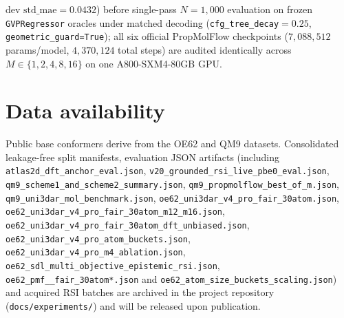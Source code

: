 \documentclass[11pt,a4paper]{article}
\begin{document}
dev $\text{std\_mae}=0.0432$) before single-pass $N=1{,}000$ evaluation on frozen \texttt{GVPRegressor} oracles under matched decoding (\texttt{cfg\_tree\_decay}$=0.25$, \texttt{geometric\_guard=True}); all six official PropMolFlow checkpoints ($7{,}088{,}512$ params/model, $4{,}370{,}124$ total steps) are audited identically across $M\in\{1,2,4,8,16\}$ on one A800-SXM4-80GB GPU.

\section*{Data availability}
{\sloppy
Public base conformers derive from the OE62\cite{stuke2020oe62} and QM9\cite{ramakrishnan2014qm9} datasets. Consolidated leakage-free split manifests, evaluation JSON artifacts (including \texttt{atlas2d\_\allowbreak dft\_\allowbreak anchor\_\allowbreak eval.json}, \texttt{v20\_\allowbreak grounded\_\allowbreak rsi\_\allowbreak live\_\allowbreak pbe0\_\allowbreak eval.json}, \texttt{qm9\_\allowbreak scheme1\_\allowbreak and\_\allowbreak scheme2\_\allowbreak summary.json}, \texttt{qm9\_\allowbreak propmolflow\_\allowbreak best\_\allowbreak of\_\allowbreak m.json}, \texttt{qm9\_\allowbreak uni3dar\_\allowbreak mol\_\allowbreak benchmark.json}, \texttt{oe62\_\allowbreak uni3dar\_\allowbreak v4\_\allowbreak pro\_\allowbreak fair\_\allowbreak 30atom.json}, \texttt{oe62\_\allowbreak uni3dar\_\allowbreak v4\_\allowbreak pro\_\allowbreak fair\_\allowbreak 30atom\_\allowbreak m12\_\allowbreak m16.json}, \texttt{oe62\_\allowbreak uni3dar\_\allowbreak v4\_\allowbreak pro\_\allowbreak fair\_\allowbreak 30atom\_\allowbreak dft\_\allowbreak unbiased.json}, \texttt{oe62\_\allowbreak uni3dar\_\allowbreak v4\_\allowbreak pro\_\allowbreak atom\_\allowbreak buckets.json}, \texttt{oe62\_\allowbreak uni3dar\_\allowbreak v4\_\allowbreak pro\_\allowbreak m4\_\allowbreak ablation.json}, \texttt{oe62\_\allowbreak sdl\_\allowbreak multi\_\allowbreak objective\_\allowbreak epistemic\_\allowbreak rsi.json}, \texttt{oe62\_\allowbreak pmf\_\allowbreak *\_\allowbreak fair\_\allowbreak 30atom*.json} and \texttt{oe62\_\allowbreak atom\_\allowbreak size\_\allowbreak buckets\_\allowbreak scaling.json}) and acquired RSI batches are archived in the project repository (\texttt{docs/\allowbreak experiments/}) and will be released upon publication.\par}
\end{document}
